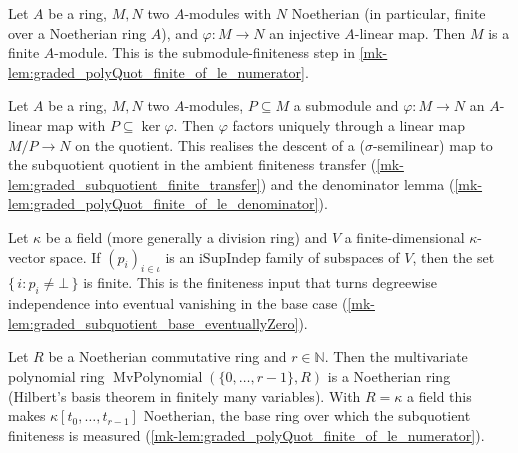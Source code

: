 \begin{lemma}
  \label{mk-lem:module_finite_of_injective_mathlib}
  \mathlibok

  Let \(A\) be a ring, \(M, N\) two \(A\)-modules with \(N\) Noetherian (in
  particular, finite over a Noetherian ring \(A\)), and \(\varphi : M \to N\) an
  injective \(A\)-linear map. Then \(M\) is a finite \(A\)-module. This is the
  submodule-finiteness step in \ref{mk-lem:graded_polyQuot_finite_of_le_numerator}.
\end{lemma}

\begin{lemma}
  \label{mk-lem:submodule_liftQ_mathlib}
  \mathlibok

  Let \(A\) be a ring, \(M, N\) two \(A\)-modules, \(P \subseteq M\) a submodule and
  \(\varphi : M \to N\) an \(A\)-linear map with \(P \subseteq \ker\varphi\). Then
  \(\varphi\) factors uniquely through a linear map \(M/P \to N\) on the quotient.
  This realises the descent of a (\(\sigma\)-semilinear) map to the subquotient
  quotient in the ambient finiteness transfer
  (\ref{mk-lem:graded_subquotient_finite_transfer}) and the denominator lemma
  (\ref{mk-lem:graded_polyQuot_finite_of_le_denominator}).
\end{lemma}

\begin{lemma}
  \label{mk-lem:finite_ne_bot_of_iSupIndep_mathlib}
  \mathlibok

  Let \(\kappa\) be a field (more generally a division ring) and \(V\) a
  finite-dimensional \(\kappa\)-vector space. If \((p_i)_{i \in \iota}\) is an
  \(\mathrm{iSupIndep}\) family of subspaces of \(V\), then the set
  \(\{\,i : p_i \ne \bot\,\}\) is finite. This is the finiteness input that turns
  degreewise independence into eventual vanishing in the base case
  (\ref{mk-lem:graded_subquotient_base_eventuallyZero}).
\end{lemma}

\begin{lemma}
  \label{mk-lem:mvPolynomial_isNoetherianRing_fin_mathlib}
  \mathlibok

  Let \(R\) be a Noetherian commutative ring and \(r \in \mathbb{N}\). Then the
  multivariate polynomial ring \(\operatorname{MvPolynomial}(\{0, \dots, r-1\}, R)\)
  is a Noetherian ring (Hilbert's basis theorem in finitely many variables). With
  \(R = \kappa\) a field this makes \(\kappa[t_0, \dots, t_{r-1}]\) Noetherian, the
  base ring over which the subquotient finiteness is measured
  (\ref{mk-lem:graded_polyQuot_finite_of_le_numerator}).
\end{lemma}

